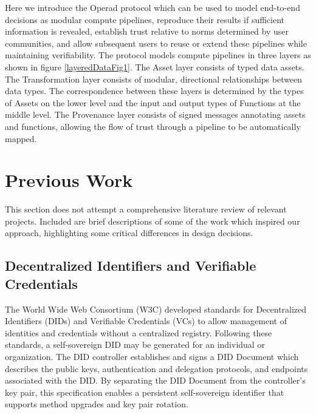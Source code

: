 \documentclass[9pt, oneside]{article}   	%
\begin{document}
Here we introduce the Operad protocol which can be used to model end-to-end decisions as modular compute pipelines, reproduce their results if sufficient information is revealed, establish trust relative to norms determined by user communities, and allow subsequent users to reuse or extend these pipelines while maintaining verifiability. The protocol models compute pipelines in three layers as shown in figure \ref{layeredDataFig1}. The Asset layer consists of typed data assets. The Transformation layer consists of modular, directional relationships between data types. The correspondence between these layers is determined by the types of Assets on the lower level and the input and output types of Functions at the middle level. The Provenance layer consists of signed messages annotating assets and functions, allowing the flow of trust through a pipeline to be automatically mapped.

\section{Previous Work}\label{PrevWork}

This section does not attempt a comprehensive literature review of relevant projects. Included are brief descriptions of some of the work which inspired our approach, highlighting some critical differences in design decisions.

\subsection{Decentralized Identifiers and Verifiable Credentials}\label{did-vc}

The World Wide Web Consortium (W3C) developed standards for Decentralized Identifiers (DIDs) and Verifiable Credentials (VCs) to allow management of identities and credentials without a centralized registry. Following these standards, a self-sovereign DID may be generated for an individual or organization. The DID controller establishes and signs a DID Document which describes the public keys, authentication and delegation protocols, and endpoints associated with the DID. By separating the DID Document from the controller's key pair, this specification enables a persistent self-sovereign identifier that supports method upgrades and key pair rotation. \cite{w3cDID}
\end{document}
